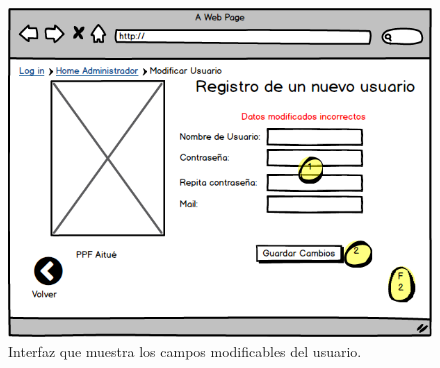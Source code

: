 \begin{figure}[h!]
	\label{moduser6}
	\begin{center}
		\includegraphics[scale=0.3]{imagenes/moduser6.png}
	\end{center}
	\caption{Interfaz que muestra los campos modificables del usuario.}
\end{figure}

